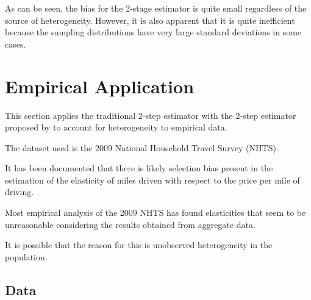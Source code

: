 \documentclass{article}
\begin{document}
\begin{table}[htbp]


\end{table}


\begin{table}[htbp]


\end{table}

\begin{table}[htbp]


\end{table}

\begin{table}[htbp]


\end{table}

\begin{table}[htbp]


\end{table}

As can be seen, the bias for the \citet{reichert2014} 2-stage estimator is quite small regardless of the source of heterogeneity.  However, it is also apparent that it is quite inefficient because the sampling distributions have very large standard deviations in some cases.


\section{Empirical Application}

This section applies the traditional \citet{heckman1979} 2-step estimator with the 2-step estimator proposed by \citet{reichert2014} to account for heterogeneity to empirical data.  

The dataset used is the 2009 National Household Travel Survey (NHTS).  

It has been documented that there is likely selection bias present in the estimation of the elasticity of miles driven with respect to the price per mile of driving.

Most empirical analysis of the 2009 NHTS has found elasticities that seem to be unreasonable considering the results obtained from aggregate data.  

It is possible that the reason for this is unobserved heterogeneity in the population.

\subsection{Data}
\end{document}
